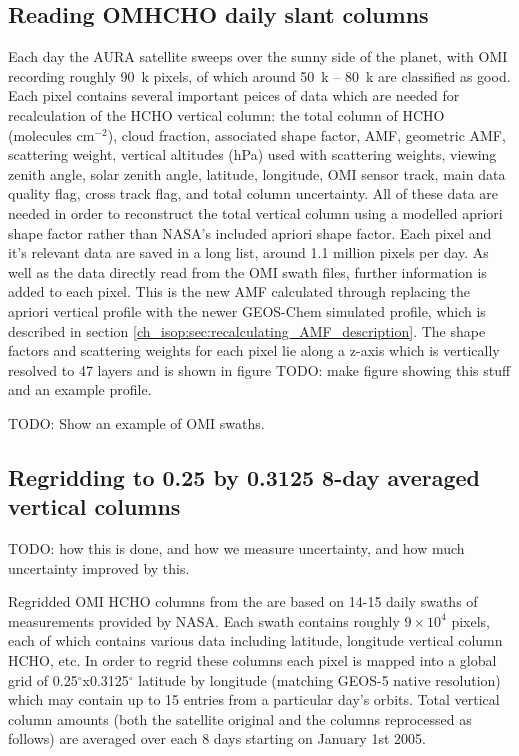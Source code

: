     
  \subsection{Reading OMHCHO daily slant columns}
    Each day the AURA satellite sweeps over the sunny side of the planet, with OMI recording roughly 90~k pixels, of which around 50~k -- 80~k are classified as good.
    Each pixel contains several important peices of data which are needed for recalculation of the HCHO vertical column: the total column of HCHO (molecules cm$^{-2}$), cloud fraction, associated shape factor, AMF, geometric AMF, scattering weight, vertical altitudes (hPa) used with scattering weights, viewing zenith angle, solar zenith angle, latitude, longitude, OMI sensor track, main data quality flag, cross track flag, and total column uncertainty.
    All of these data are needed in order to reconstruct the total vertical column using a modelled apriori shape factor rather than NASA's included apriori shape factor.
    Each pixel and it's relevant data are saved in a long list, around 1.1 million pixels per day.
    As well as the data directly read from the OMI swath files, further information is added to each pixel.
    This is the new AMF calculated through replacing the apriori vertical profile with the newer GEOS-Chem simulated profile, which is described in section \ref{ch_isop:sec:recalculating_AMF_description}.
    The shape factors and scattering weights for each pixel lie along a z-axis which is vertically resolved to 47 layers and is shown in figure TODO: make figure showing this stuff and an example profile.
    
    TODO: Show an example of OMI swaths.
    
  \subsection{Regridding to 0.25 by 0.3125 8-day averaged vertical columns}
    TODO: how this is done, and how we measure uncertainty, and how much uncertainty improved by this.
    
    Regridded OMI HCHO columns from the are based on 14-15 daily swaths of measurements provided by NASA. 
    Each swath contains roughly $9 \times 10^4$ pixels, each of which contains various data including latitude, longitude vertical column HCHO, etc.
    In order to regrid these columns each pixel is mapped into a global grid of 0.25$^{\circ}$x0.3125$^{\circ}$ latitude by longitude (matching GEOS-5 native resolution) which may contain up to 15 entries from a particular day's orbits.
    Total vertical column amounts (both the satellite original and the columns reprocessed as follows) are averaged over each 8 days starting on January 1st 2005.
    
